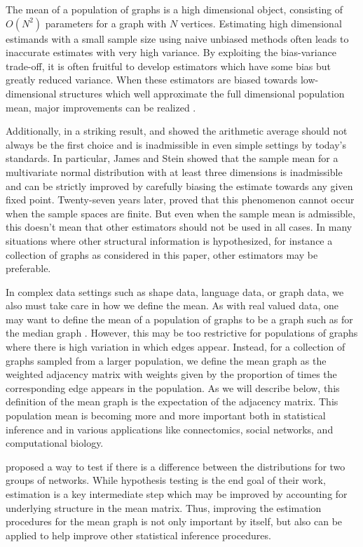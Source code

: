 \documentclass[10pt,letterpaper]{article}
\begin{document}
The mean of a population of graphs is a high dimensional object, consisting of $O(N^2)$ parameters for a graph with $N$ vertices.
Estimating high dimensional estimands with a small sample size using naive unbiased methods often leads to inaccurate estimates with very high variance.
By exploiting the bias-variance trade-off, it is often fruitful to develop estimators which have some bias but greatly reduced variance.
When these estimators are biased towards low-dimensional structures which well approximate the full dimensional population mean, major improvements can be realized \citep{trunk1979problem}.


Additionally, in a striking result, \citet{stein1956inadmissibility} and \citet{james1961estimation} showed the arithmetic average should not always be the first choice and is inadmissible in even simple settings by today's standards. 
In particular, James and Stein showed that the sample mean for a multivariate normal distribution with at least three dimensions is inadmissible and can be strictly improved by carefully biasing the  estimate towards any given fixed point. 
Twenty-seven years later, \citet{gutmann1982stein} proved that this phenomenon cannot occur when the sample spaces are finite.
But even when  the sample mean is admissible, this doesn't mean that other estimators should not be used in all cases.
In many situations where other structural information is hypothesized, for instance a collection of graphs as considered in this paper, other estimators may be preferable.

In complex data settings such as shape data, language data, or graph data, we also must take care in how we define the mean.
As with real valued data, one may want to define the mean of a population of graphs to be a graph such as for the median graph \citep{jiang2001median}.
However, this may be too restrictive for populations of graphs where there is high variation in which edges appear. 
Instead, for a collection of graphs sampled from a larger population, we define the mean graph as the weighted adjacency matrix with weights given by the proportion of times the corresponding edge appears in the population. 
As we will describe below, this definition of the mean graph is the expectation of the adjacency matrix.
This population mean is becoming more and more important both in statistical inference and in various applications like connectomics, social networks, and computational biology.



\citet{ginestet2014hypothesis} proposed a way to test if there is a difference between the distributions for two groups of networks.  
While hypothesis testing is the end goal of their work, estimation is a key intermediate step which may be improved by accounting for underlying structure in the mean matrix. 
Thus, improving the estimation procedures for the mean graph is not only important by itself, but also can be applied to help improve other statistical inference procedures.
\end{document}
